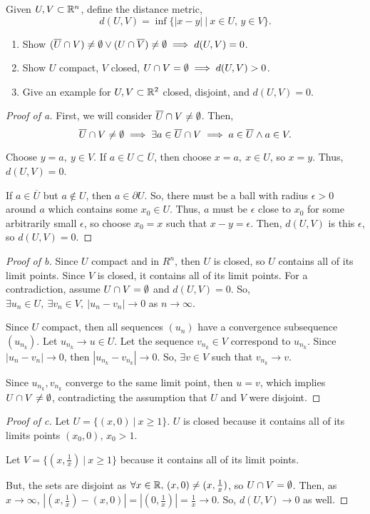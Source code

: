 \documentclass[../hw3]{subfiles}
\begin{document}
\begin{problem}[2]
Given $U,V\subset \mathbb{R}^{n}$, define the distance metric, \[
	d(U,V)=\inf \{|x-y|\ |\ x\in U,\, y\in V\}
	.\]
\begin{enumerate}[label=\alph*)]
	\item Show $(\overline{U}\cap V)\neq\emptyset \lor (U\cap \overline{V})\neq\emptyset \implies d(U,V)=0$.
	\item Show $U$ compact,  $V$ closed,  $U\cap V = \emptyset\implies d(U,V)>0$.
	\item Give an example for $U,V\subset \mathbb{R}^{2}$ closed, disjoint, and $d(U,V)=0$.
\end{enumerate}
\end{problem}
\begin{proof}[Proof of a]
	First, we will consider $\overline{U}\cap V\neq\emptyset$. Then, \[
		\overline{U}\cap V\neq\emptyset\implies\exists a\in \overline{U}\cap V\implies a\in \overline{U}\land a\in V
		.\]

	Choose $y=a,\ y\in V$. If $a\in U \subset \overline{U}$, then choose $x=a,\ x \in U$, so $x=y$. Thus, $d(U,V)=0$.

	If $a \in \overline{U}$ but $a \not\in U$, then $a\in \partial{U}$. So, there must be a ball with radius $\epsilon>0$ around  $a$ which contains some  $x_0\in U$. Thus, $a$ must be  $\epsilon$ close to  $x_0$ for some arbitrarily small  $\epsilon$, so choose $x_0=x$ such that $x-y=\epsilon$. Then, $d(U,V)$ is this $\epsilon$, so  $d(U,V)=0$.
\end{proof}
\begin{proof}[Proof of b]
	Since $U$ compact and in $R^{n}$, then $U$ is closed, so  $U$ contains all of its limit points. Since  $V$ is  closed, it contains all of its limit points.
	For a contradiction, assume $U\cap V=\emptyset$ and $d(U,V)=0$. So, $\exists u_n \in U,\ \exists v_n\in V,\ |u_n-v_n|\to 0$ as $n\to \infty$.

	Since $U$ compact, then all sequences  $(u_n)$ have a convergence subsequence $(u_{n_k})$. Let $u_{n_k} \to u\in U$.
	Let the sequence $v_{n_k}\in V$ correspond to $u_{n_k}$. Since $|u_n-v_n|\to 0$, then $|u_{n_k}-v_{n_k}|\to 0$. So, $\exists v\in V$ such that $v_{n_k}\to v$.

	Since $u_{n_k}, v_{n_k}$ converge to the same limit point, then $u=v$, which implies $U\cap V \neq\emptyset$, contradicting the assumption that $U$ and  $V$ were disjoint.
\end{proof}
\begin{proof}[Proof of c]
	Let $U = \{(x,0)\ |\ x \ge 1\} $. $U$ is closed because it contains all of its limits points  $(x_0,0),\,x_0>1$.

	Let $V = \{(x,\frac{1}{x})\ |\ x\ge 1\} $ because it contains all of its limit points. %

	But, the sets are disjoint as $\forall x\in \mathbb{R},\,(x,0)\neq(x,\frac{1}{x})$, so $U\cap V= \emptyset$. Then, as $x\to \infty,\, |(x,\frac{1}{x})-(x,0)| = |(0,\frac{1}{x})| = \frac{1}{x} \to 0$. So, $d(U,V)\to 0$ as well.
\end{proof}
\end{document}
